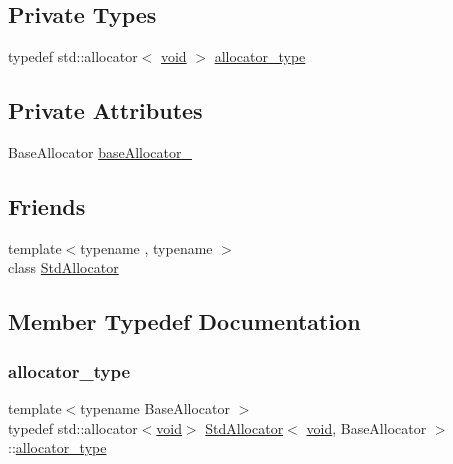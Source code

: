\subsection*{Private Types}
\begin{DoxyCompactItemize}
\item 
typedef std\+::allocator$<$ \hyperlink{imgui__impl__opengl3__loader_8h_ac668e7cffd9e2e9cfee428b9b2f34fa7}{void} $>$ \hyperlink{classStdAllocator_3_01void_00_01BaseAllocator_01_4_aa894cbe0a0970c07b34e4320e6054c10}{allocator\+\_\+type}
\end{DoxyCompactItemize}
\subsection*{Private Attributes}
\begin{DoxyCompactItemize}
\item 
Base\+Allocator \hyperlink{classStdAllocator_3_01void_00_01BaseAllocator_01_4_ac691821bb9f8c7f557c7d3c069b37dc2}{base\+Allocator\+\_\+}
\end{DoxyCompactItemize}
\subsection*{Friends}
\begin{DoxyCompactItemize}
\item 
{\footnotesize template$<$typename , typename $>$ }\\class \hyperlink{classStdAllocator_3_01void_00_01BaseAllocator_01_4_afb3a6a655f835f6b9ec21fab41291287}{Std\+Allocator}
\end{DoxyCompactItemize}


\subsection{Member Typedef Documentation}
\mbox{\label{classStdAllocator_3_01void_00_01BaseAllocator_01_4_aa894cbe0a0970c07b34e4320e6054c10}} 
\subsubsection{\texorpdfstring{allocator\+\_\+type}{allocator\_type}}
{\footnotesize\ttfamily template$<$typename Base\+Allocator $>$ \\
typedef std\+::allocator$<$\hyperlink{imgui__impl__opengl3__loader_8h_ac668e7cffd9e2e9cfee428b9b2f34fa7}{void}$>$ \hyperlink{classStdAllocator}{Std\+Allocator}$<$ \hyperlink{imgui__impl__opengl3__loader_8h_ac668e7cffd9e2e9cfee428b9b2f34fa7}{void}, Base\+Allocator $>$\+::\hyperlink{classStdAllocator_3_01void_00_01BaseAllocator_01_4_aa894cbe0a0970c07b34e4320e6054c10}{allocator\+\_\+type}\hspace{0.3cm}{\ttfamily [private]}}

